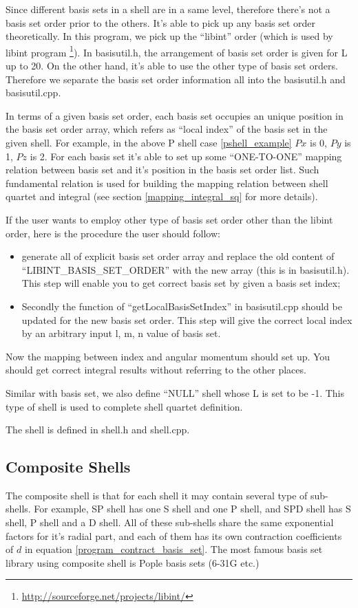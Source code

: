 Since different basis sets in a shell are in a same level, therefore
there's not a basis set order prior to the others. It's able to 
pick up any basis set order theoretically. In this program, we 
pick up the ``libint'' order (which is used by libint program
\footnote{\url{http://sourceforge.net/projects/libint/}}). 
In basisutil.h, the arrangement of basis set order is given for 
L up to 20. On the other hand, it's able to use the other 
type of basis set orders. Therefore we separate the basis set 
order information all into the basisutil.h and basisutil.cpp.

In terms of a given basis set order, each basis set occupies an
unique position in the 
basis set order array, which refers as ``local index'' of the 
basis set in the given shell. For example, in the above P shell
case \ref{pshell_example} $Px$ is 0, $Py$ is 1, $Pz$ is 2. For 
each basis set it's able to set up some ``ONE-TO-ONE'' mapping 
relation between basis set and it's position in the basis set 
order list. Such fundamental relation is used for building the 
mapping relation between shell quartet and integral (see 
section \ref{mapping_integral_sq} for more details).

If the user wants to employ other type of basis set order other 
than the libint order, here is the procedure the user should
follow:
\begin{itemize}
 \item generate all of explicit basis set order array and 
	 replace the old content of ``LIBINT\_BASIS\_SET\_ORDER''
	 with the new array (this is in basisutil.h). This step
	 will enable you to get correct basis set by given 
	 a basis set index;
 \item Secondly the function of ``getLocalBasisSetIndex'' in
	 basisutil.cpp should be updated for the new basis 
	 set order. This step will give the correct local index
	 by an arbitrary input l, m, n value of basis set.
\end{itemize}
Now the mapping between index and angular momentum should 
set up. You should get correct integral results without 
referring to the other places.

Similar with basis set, we also define ``NULL'' shell whose 
L is set to be -1. This type of shell is used to complete 
shell quartet definition.

The shell is defined in shell.h and shell.cpp.

\subsection{Composite Shells}
%
\label{composite_shell}
%
%
The composite shell is that for each shell it may contain several
type of sub-shells. For example, SP shell has one S shell and one 
P shell, and SPD shell has S shell, P shell and a D shell. All of 
these sub-shells share the same exponential factors for it's radial part,
and each of them has its own contraction coefficients of $d$ in equation
\ref{program_contract_basis_set}. The most famous basis set library using 
composite shell is Pople basis sets (6-31G etc.)

